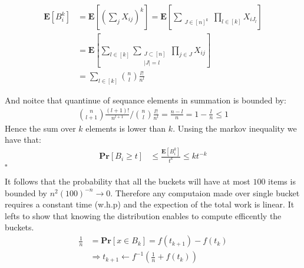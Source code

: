 \documentclass{article}
\newcommand{\prb}[1]{ \mathbf{Pr} \left[ {#1} \right]}
\newcommand{\expp}[1]{ \mathbf{E} \left[ {#1} \right]}
\newcommand{\xij} { X_{ij} }
\begin{document}
\begin{multicols*}{2}
  \begin{equation*}
    \begin{split}
      \expp{B_{i}^{k} } &= \expp{ \left( \sum_{j}{\xij } \right)^{k}  } =  \expp{ \sum_{ \substack { J \in [n]^k }  }{ \prod_{ l \in [k] } { X_{iJ_{l}} } }   } \\
      &=   \expp{ \sum_{l \in [k]}\sum_{ \substack { J \subset [n] \\ |J| = l }  }{ \prod_{j \in J} { \xij  }   }} \\
      &=   \sum_{l \in [k]}{  \binom{n}{l} \frac{l!  }{n^{l}} } 
    \end{split}
  \end{equation*}

  And noitce that quantinue of sequance elements in summation is bounded by:  
  \begin{equation*}
    \begin{split}
      \binom{n}{l+1} \frac{(l+1)!  }{n^{l+1}} /  \binom{n}{l} \frac{l!  }{n^{l}} = \frac{n-l}{n}=1-\frac{l}{n} \le 1 
    \end{split}
  \end{equation*}
  Hence the sum over $k$ elements is lower than $k$. Unsing the markov inequality we have that:  
  \begin{equation*}
    \begin{split}
    \prb{B_i \ge t} &\le \frac{\expp{B_{i}^{k}}}{t^{k}}\le kt^{-k}
    \end{split}
  \end{equation*}$\square$


  It follows that the probability that all the buckets will have at most $100$ items is bounded   by $n^{2}\left( 100 \right)^{-n} \rightarrow 0$. Therefore any computaion made over single bucket requires a constant time (w.h.p) and the expection of the total work is linear. 
  It lefts to show that knowing the distribution enables to compute efficently the buckets. 
  \begin{equation*}
    \begin{split}
      \frac{1}{n} &= \prb{ x \in B_{k} } = f\left( t_{k+1} \right)- f\left( t_{k} \right) \\
      & \Rightarrow t_{k+1} \leftarrow f^{-1}\left( \frac{1}{n} + f\left( t_{k} \right) \right) 
    \end{split}
  \end{equation*}



\end{multicols*}
\printbibliography 
\end{document}
